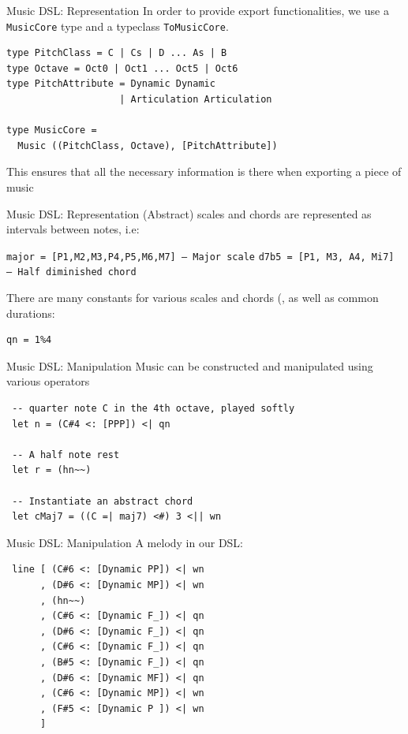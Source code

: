 \documentclass{beamer}
\newcommand{\icode}[1]{\texttt{#1}}
\begin{document}
    \begin{frame}[fragile=singleslide]{Music DSL: Representation}
    In order to provide export functionalities, we use a \icode{MusicCore} type and a typeclass \icode{ToMusicCore}.
    \begin{verbatim}
type PitchClass = C | Cs | D ... As | B
type Octave = Oct0 | Oct1 ... Oct5 | Oct6
type PitchAttribute = Dynamic Dynamic
                    | Articulation Articulation

type MusicCore =
  Music ((PitchClass, Octave), [PitchAttribute])
    \end{verbatim}

    This ensures that all the necessary information is there when exporting a piece of music
	\end{frame}
    \begin{frame}[fragile=singleslide]{Music DSL: Representation}
    (Abstract) scales and chords are represented as intervals between notes, i.e:

    \icode{major = [P1,M2,M3,P4,P5,M6,M7] -- Major scale}
    \icode{d7b5 = [P1, M3, A4, Mi7] -- Half diminished chord}

    There are many constants for various scales and chords (, as well as common durations:

    \begin{verbatim}
qn = 1%4
    \end{verbatim}
	\end{frame}

    \begin{frame}[fragile=singleslide]{Music DSL: Manipulation}
	Music can be constructed and manipulated using various operators

    \begin{verbatim}
 -- quarter note C in the 4th octave, played softly
 let n = (C#4 <: [PPP]) <| qn

 -- A half note rest
 let r = (hn~~)

 -- Instantiate an abstract chord
 let cMaj7 = ((C =| maj7) <#) 3 <|| wn
    \end{verbatim}
	\end{frame}

    \begin{frame}[fragile=singleslide]{Music DSL: Manipulation}
	A melody in our DSL:

    \begin{verbatim}
 line [ (C#6 <: [Dynamic PP]) <| wn
      , (D#6 <: [Dynamic MP]) <| wn
      , (hn~~)
      , (C#6 <: [Dynamic F_]) <| qn
      , (D#6 <: [Dynamic F_]) <| qn
      , (C#6 <: [Dynamic F_]) <| qn
      , (B#5 <: [Dynamic F_]) <| qn
      , (D#6 <: [Dynamic MF]) <| qn
      , (C#6 <: [Dynamic MP]) <| wn
      , (F#5 <: [Dynamic P ]) <| wn
      ]
    \end{verbatim}
	\end{frame}
\end{document}
